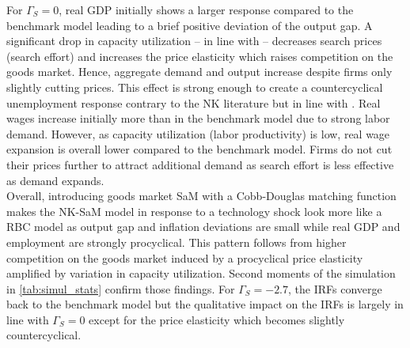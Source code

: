 \documentclass[12pt,3p,authoryear,review]{elsarticle}
\begin{document}
For $\Gamma_S = 0$, real GDP initially shows a larger response compared to the benchmark model leading to a brief positive deviation of the output gap. A significant drop in capacity utilization -- in line with \cite{basuAreTechnologyImprovements2006,huo2023utilization} -- decreases search prices (search effort) and increases the price elasticity which raises competition on the goods market. Hence, aggregate demand and output increase despite firms only slightly cutting prices. This effect is strong enough to create a countercyclical unemployment response contrary to the NK literature \citep{francis2005technology,gali1999technology} but in line with \cite{safonova2017home,faccini2022importance}. Real wages increase initially more than in the benchmark model due to strong labor demand. However, as capacity utilization (labor productivity) is low, real wage expansion is overall lower compared to the benchmark model. Firms do not cut their prices further to attract additional demand as search effort is less effective as demand expands.\\%
Overall, introducing goods market SaM with a Cobb-Douglas matching function makes the NK-SaM model in response to a technology shock look more like a RBC model as output gap and inflation deviations are small while real GDP and employment are strongly procyclical. This pattern follows from higher competition on the goods market induced by a procyclical price elasticity amplified by variation in capacity utilization. Second moments of the simulation in \cref{tab:simul_stats} confirm those findings. For $\Gamma_S = -2.7$, the IRFs converge back to the benchmark model but the qualitative impact on the IRFs is largely in line with $\Gamma_S = 0$ except for the price elasticity which becomes slightly countercyclical.%
\end{document}
